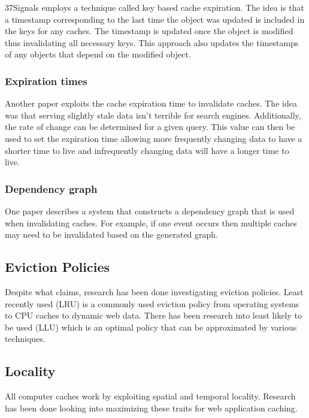 \documentclass[12pt]{article}
\begin{document}
37Signals employs a technique called key based cache expiration. \cite{keyBasedCacheExpiration}
The idea is that a timestamp corresponding to the last time the object was updated is included in the keys for any caches.
The timestamp is updated once the object is modified thus invalidating all necessary keys.
This approach also updates the timestamps of any objects that depend on the modified object.

\subsubsection{Expiration times}
Another paper exploits the cache expiration time to invalidate caches. \cite{refreshingPerspectiveSearch}
The idea was that serving slightly stale data isn't terrible for search engines.
Additionally, the rate of change can be determined for a given query.
This value can then be used to set the expiration time allowing more frequently changing data to have a shorter time to live and infrequently changing data will have a longer time to live.

\subsubsection{Dependency graph}
One paper describes a system that constructs a dependency graph that is used when invalidating caches. \cite{scalableConsistentCaching}
For example, if one event occurs then multiple caches may need to be invalidated based on the generated graph.

\subsection{Eviction Policies}
Despite what \cite{refreshingPerspectiveSearch} claims, research has been done investigating eviction policies.
Least recently used (LRU) is a commonly used eviction policy from operating systems to CPU caches to dynamic web data.
There has been research into least likely to be used (LLU) which is an optimal policy that can be approximated by various techniques.

\subsection{Locality}
All computer caches work by exploiting spatial and temporal locality.
Research has been done looking into maximizing these traits for web application caching. \cite{onCachingSearchEngineResults} \cite{cacheAdmissionPolicies}
\end{document}
